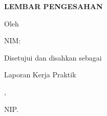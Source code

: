 \begin{titlepage}
\begin{center}
\vspace*{0.2cm}
{\bfseries\Large LEMBAR PENGESAHAN\par}
\vspace{0.4cm}
{\bfseries\large \JudulLaporan\par
\vspace{0.2cm}
\bfseries\large \TempatKP\par}
\vspace{0.6cm}
{Oleh\par
\large \textbf{\NamaMahasiswa}\par
\large NIM: \NIM\par}
\vfill
{Disetujui dan disahkan sebagai\par
Laporan Kerja Praktik\par}
\vfill
{\KotaPerusahaan, \TanggalPengesahan\par}
\vspace{0.4cm}
{\JabatanPembimbingPerusahaan\par
\NamaInstansi\par}
\vspace{1.6cm}
{\underline{\NamaPembimbingPerusahaan}\par
NIP. \NomorPegawai\par}
\end{center}
\end{titlepage}
